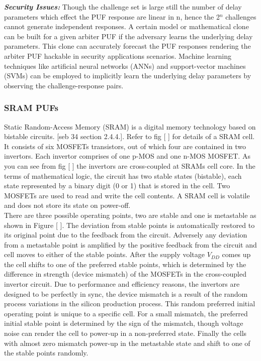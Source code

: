 \textbf{\emph{Security Issues:}}
Though the challenge set is large still the number of delay parameters which effect the PUF response are linear in n, hence the 2$^n$ challenges cannot generate independent responses. A certain model or mathematical clone can be built for a given arbiter PUF if the adversary learns the underlying delay parameters. This clone can accurately forecast the PUF responses rendering the arbiter PUF hackable in security applications scenarios. Machine learning techniques like artificial neural
networks (ANNs) and support-vector machines (SVMs) can be employed to implicitly learn the underlying delay parameters by observing the challenge-response pairs.

\subsubsection{SRAM PUFs}
\label{srampufs}

Static Random-Access Memory (SRAM) is a digital memory technology based on bistable circuits. [seb 34 section 2.4.4.]. Refer to fig [ ] for details of a SRAM cell. It consists of six MOSFETs transistors, out of which four are contained in two invertors. Each invertor comprises of one p-MOS and one n-MOS MOSFET. As you can see from fig [ ] the invertors are cross-coupled at SRAMs cell core. In the terms of mathematical logic, the circuit has two stable states (bistable), each state represented by a binary
digit (0 or 1) that is stored in the cell. Two MOSFETs are used to read and write the cell contents. A SRAM cell is volatile and does not store its state on power-off.\\

There are three possible operating points, two are stable and one is metastable as shown in Figure [ ]. The deviation from stable points is automatically restored to its original point due to the feedback from the circuit. Adversely any deviation from a metastable point is amplified by the positive feedback from the circuit and cell moves to either of the stable points. After the supply voltage $V_{DD}$ comes up the cell shifts to one of the preferred stable points, which is determined by the difference in
strength (device mismatch) of the MOSFETs in the cross-coupled invertor circuit. Due to performance and efficiency reasons, the invertors are designed to be perfectly in sync, the device mismatch is a result of the random process variations in the silicon production process. This random preferred initial operating point is unique to a specific cell. For a small mismatch, the preferred initial stable point is determined by the sign of the mismatch, though voltage noise can render the cell to
power-up in a non-preferred state. Finally the cells with almost zero mismatch power-up in the metastable state and shift to one of the stable points randomly.\\

